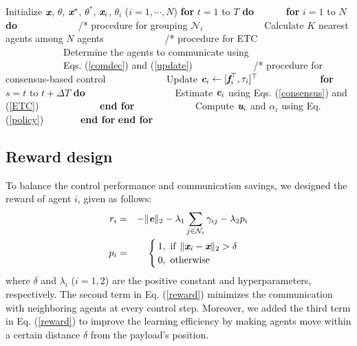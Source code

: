 \documentclass[letterpaper, 10 pt, conference]{ieeeconf} %
\begin{document}
\begin{algorithm}
\caption{: ETC and consensus-based control}
\label{algorithm}
\begin{algorithmic}[1]
\STATE Initialize $\textit{\textbf{x}}$, $\theta$, $\textit{\textbf{x}}^{\ast}$, $\theta^{\ast}$, $\textit{\textbf{x}}_i$, $\theta_i$ ($i=1,\cdots,N$)
\STATE \textbf{for} $t=1$ to $T$ \textbf{do}
\STATE \ \ \ \ \ \ \textbf{for} $i=1$ to $N$ \textbf{do}
\STATE \ \ \ \ \ \ \ \ \ \ \ \ /* procedure for grouping $\mathcal{N}_i$
\STATE \ \ \ \ \ \ \ \ \ \ \ \ Calculate $K$ nearest agents among $N$ agents
\STATE \ \ \ \ \ \ \ \ \ \ \ \ /* procedure for ETC
\STATE \ \ \ \ \ \ \ \ \ \ \ \ Determine the agents to communicate using \\
\ \ \ \ \ \ \ \ \ \ \ \ Eqs. (\ref{comdec}) and (\ref{update})
\STATE \ \ \ \ \ \ \ \ \ \ \ \ /* procedure for consensus-based control
\STATE \ \ \ \ \ \ \ \ \ \ \ \ Update $\textit{\textbf{c}}_i\leftarrow [\textit{\textbf{f}}_i^{\top}, \tau_i]^{\top}$
\STATE \ \ \ \ \ \ \ \ \ \ \ \ \textbf{for} $s=t$ to $t+\Delta T$ \textbf{do}
\STATE \ \ \ \ \ \ \ \ \ \ \ \ \ \ \ \ \ \ Estimate $\textit{\textbf{c}}_i$ using Eqs. (\ref{consensus}) and (\ref{ETC})
\STATE \ \ \ \ \ \ \ \ \ \ \ \ \textbf{end for}
\STATE \ \ \ \ \ \ \ \ \ \ \ \ Compute $\textit{\textbf{u}}_i$ and $\alpha_i$ using Eq. (\ref{policy})
\STATE \ \ \ \ \ \ \ \textbf{end for}
\STATE \textbf{end for}
\end{algorithmic}
\end{algorithm}

\subsection{Reward design}
To balance the control performance and communication savings, we designed the reward of agent $i$, given as follows:
\begin{eqnarray}
r_i&=&-\| \textit{\textbf{e}}\|_2-\lambda_1 \sum_{j\in \mathcal{N}_i}\gamma_{ij}-\lambda_2 p_i \label{reward} \\
p_i&=&
\begin{cases}
1, \ \rm{if \ } \| \textit{\textbf{x}}\it{}_i-\textit{\textbf{x}}\|_{\rm{2}}>\delta \\
0, \ \rm{otherwise}\\
\end{cases}
\label{penalty}
\end{eqnarray}
where $\delta$ and $\lambda_i$ ($i=1, 2$) are the positive constant and hyperparameters, respectively.
The second term in Eq. (\ref{reward}) minimizes the communication with neighboring agents at every control step.
Moreover, we added the third term in Eq. (\ref{reward}) to improve the learning efficiency by making agents move within a certain distance $\delta$ from the payload's position.
\end{document}

